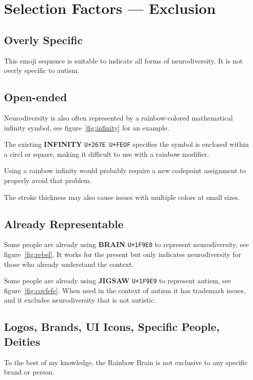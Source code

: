 \section{Selection Factors --- Exclusion}

\subsection{Overly Specific}

This emoji sequence is suitable to indicate all forms of neurodiversity. It is not
overly specific to autism.

\subsection{Open-ended}

Neurodiversity is also often represented by a rainbow-colored mathematical infinity
symbol, see figure~\ref{fig:infinity} for an example.

The existing \textbf{INFINITY} \texttt{U+267E U+FEOF} specifies the symbol is enclosed
within a circl or square, making it difficult to use with a rainbow modifier.

Using a rainbow infinity would probably require a new codepoint assignment to properly avoid that problem.

The stroke thickness may also cause issues with multiple colors at small sizes.

\subsection{Already Representable}

Some people are already using \textbf{BRAIN} \texttt{U+1F9E0} to represent neurodiversity, see
figure~\ref{fig:rebel}. It works for the present but only indicates neurodiversity for those
who already understand the context.

Some people are already using \textbf{JIGSAW} \texttt{U+1F9E9} to represent autism, see
figure~\ref{fig:covfefe}. When used in the context of autism it has trademark issues, and it
excludes neurodiversity that is not autistic.

\subsection{Logos, Brands, UI Icons, Specific People, Deities}

To the best of my knowledge, the Rainbow Brain is not exclusive to any specific brand or
person.

